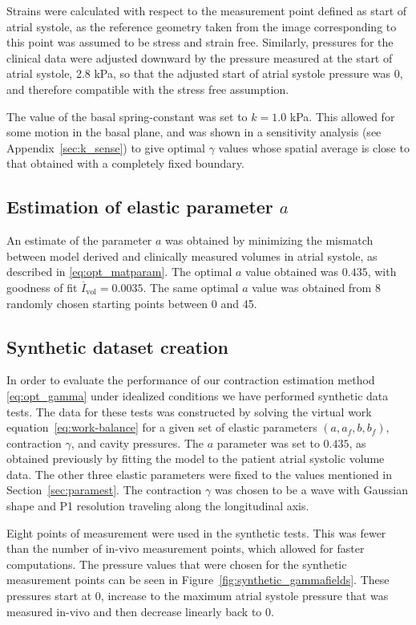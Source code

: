 Strains were calculated with respect to the measurement point defined
as start of atrial systole, as the reference geometry taken from the
image corresponding to this point was assumed to be stress and strain
free. Similarly, pressures for the clinical data were adjusted
downward by the pressure measured at the start of atrial systole, 2.8
kPa, so that the adjusted start of atrial systole pressure was 0, and
therefore compatible with the stress free assumption.

The value of the basal spring-constant was set to $k = 1.0$ kPa. This allowed for some
motion in the basal plane,
and was shown in a sensitivity analysis (see Appendix~\ref{sec:k_sense})
to give optimal $\gamma$ values
whose spatial average is close to that obtained with a completely fixed boundary.

\subsection{Estimation of elastic parameter $a$}
\label{sec:elasticparam}
An estimate of the parameter $a$ was obtained by minimizing the mismatch between
model derived and clinically measured volumes in atrial systole,
as described in \eqref{eq:opt_matparam}. The optimal $a$ value obtained was $0.435$, 
with goodness of fit $\overline{I}_{\text{vol}} = 0.0035$.
The same optimal $a$ value was obtained from 8 randomly chosen starting points
between 0 and 45.


\subsection{Synthetic dataset creation}

\label{sec:data_synthetic}
In order to evaluate the performance of our contraction estimation
method \eqref{eq:opt_gamma} under idealized conditions we  
have performed synthetic data tests. The data for these tests was
constructed by solving the virtual work 
equation~\eqref{eq:work-balance} for a given set of elastic parameters
 $(a, a_f, b, b_f)$, contraction $\gamma$, and cavity pressures.
The $a$ parameter was set to $0.435$, as obtained previously by
fitting the model to the patient atrial systolic volume data. The
other three elastic parameters were fixed to the values mentioned in Section~\ref{sec:paramest}.
The contraction $\gamma$ was chosen to be a wave 
with Gaussian shape and P1 resolution traveling along the longitudinal axis.

Eight points of measurement were used in the synthetic tests. This was
fewer than the number of in-vivo  
measurement points, which allowed for faster computations. The
pressure values that were chosen  
for the synthetic measurement points
can be seen in Figure~\ref{fig:synthetic_gammafields}. These pressures start at 0, 
increase to the maximum atrial systole pressure 
that was measured in-vivo and then decrease linearly back to 0. 


